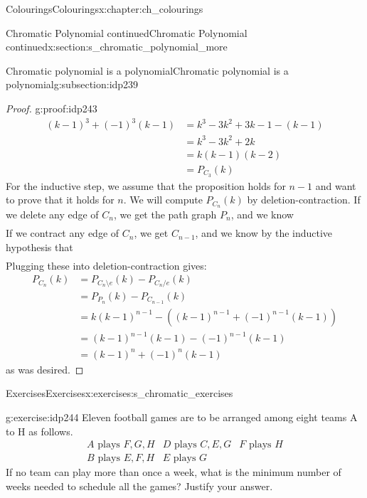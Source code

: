 \documentclass[oneside,10pt,]{book}
\numberwithin{equation}{section}
\newcommand{\amp}{&}
\begin{document}
\begin{chapterptx}{Colourings}{}{Colourings}{}{}{x:chapter:ch_colourings}
\begin{sectionptx}{Chromatic Polynomial continued}{}{Chromatic Polynomial continued}{}{}{x:section:s_chromatic_polynomial_more}
\begin{subsectionptx}{Chromatic polynomial is a polynomial}{}{Chromatic polynomial is a polynomial}{}{}{g:subsection:idp239}
\begin{proof}{}{g:proof:idp243}
\begin{align*}
(k-1)^3+(-1)^3(k-1)\amp =k^3-3k^2+3k-1-(k-1)\\
\amp=k^3-3k^2+2k\\
\amp =k(k-1)(k-2) \\
\amp=P_{C_3}(k)
\end{align*}
For the inductive step, we assume that the proposition holds for \(n-1\) and want to prove that it holds for \(n\).  We will compute \(P_{C_n}(k)\) by deletion-contraction.  If we delete any edge of \(C_n\), we get the path graph \(P_n\), and we know%
%
\begin{gather*}
\end{gather*}
If we contract any edge of \(C_n\), we get \(C_{n-1}\), and we know by the inductive hypothesis that%
%
\begin{gather*}
\end{gather*}
Plugging these into deletion-contraction gives:%
%
\begin{align*}
P_{C_n}(k) \amp = P_{C_n \setminus e}(k)-P_{C_n/e}(k) \\
\amp = P_{P_n}(k)-P_{C_{n-1}}(k) \\
\amp = k(k-1)^{n-1} - \left((k-1)^{n-1}+(-1)^{n-1}(k-1) \right)\\
\amp = (k-1)^{n-1}(k-1) - (-1)^{n-1}(k-1) \\
\amp = (k-1)^n+(-1)^n(k-1) 
\end{align*}
as was desired.%
\end{proof}
\end{subsectionptx}
\end{sectionptx}
%
%
\typeout{************************************************}
\typeout{************************************************}
%
\begin{exercises-section}{Exercises}{}{Exercises}{}{}{x:exercises:s_chromatic_exercises}
\begin{divisionexercise}{1}{}{}{g:exercise:idp244}%
Eleven football games are to be arranged among eight teams A to H as follows.%
%
\begin{equation*}
\begin{array}{l|l|l}
A \text{ plays } F,G,H \amp D \text{ plays } C,E,G \amp F \text{ plays } H \\
B \text{ plays } E,F,H \amp E \text{ plays }G \amp
\end{array}
\end{equation*}
If no team can play more than once a week, what is the minimum number of weeks needed to schedule all the games? Justify your answer.%
\end{divisionexercise}%

\end{exercises-section}
\end{chapterptx}
\end{document}
